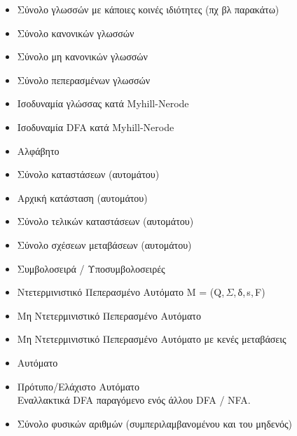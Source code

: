 

\doublespacing
\begin{itemize}
	\item{ Σύνολο γλωσσών με κάποιες κοινές ιδιότητες (πχ βλ παρακάτω)}
	\item{ Σύνολο κανονικών γλωσσών}
	\item{ Σύνολο μη κανονικών γλωσσών}
	\item{ Σύνολο πεπερασμένων γλωσσών}
	\item{ Ισοδυναμία γλώσσας κατά Myhill-Nerode}
	\item{ Ισοδυναμία DFA κατά Myhill-Nerode}
	\item{\makebox[2cm]{$\Sigma$ \hfill} Αλφάβητο}
	\item{ Σύνολο καταστάσεων (αυτομάτου)}
	\item{ Αρχική κατάσταση (αυτομάτου)}
	\item{ Σύνολο τελικών καταστάσεων (αυτομάτου)}
	\item{ Σύνολο σχέσεων μεταβάσεων (αυτομάτου)}
	\item{ Συμβολοσειρά / Υποσυμβολοσειρές}
	\item{ Ντετερμινιστικό Πεπερασμένο Αυτόματο Μ = (Q,\,$\Sigma$,\,δ,\,s,\,F)}
	\item{ Μη Ντετερμινιστικό Πεπερασμένο Αυτόματο}
	\item{ Μη Ντετερμινιστικό Πεπερασμένο Αυτόματο με κενές μεταβάσεις}
	\item{ Αυτόματο}
	\item{ Πρότυπο/Ελάχιστο Αυτόματο\\
		\makebox[2.14cm]{\hfill}Εναλλακτικά DFA παραγόμενο ενός άλλου DFA / NFA.}
	\item{ Σύνολο φυσικών αριθμών (συμπεριλαμβανομένου και του μηδενός)}

\end{itemize}
